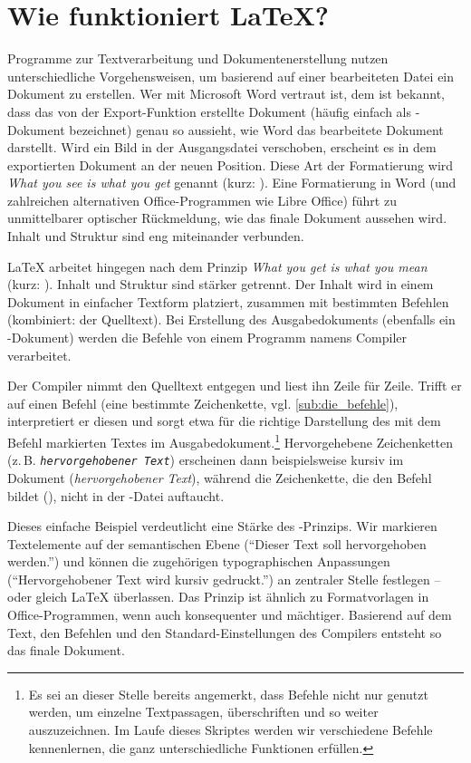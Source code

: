 \section{Wie funktioniert \LaTeX?}
\label{sec:wie_funktioniert_latex_}

Programme zur Textverarbeitung und Dokumentenerstellung nutzen unterschiedliche Vorgehensweisen, um basierend auf einer bearbeiteten Datei ein Dokument zu erstellen.
Wer mit Microsoft Word vertraut ist, dem ist bekannt, dass das von der Export-Funktion erstellte Dokument (häufig einfach als -Dokument bezeichnet) genau so aussieht, wie Word das bearbeitete Dokument darstellt.
Wird ein Bild in der Ausgangsdatei verschoben, erscheint es in dem exportierten Dokument an der neuen Position.
Diese Art der Formatierung wird \emph{What you see is what you get} genannt (kurz: ).
Eine Formatierung in Word (und zahlreichen alternativen Office-Programmen wie Libre Office) führt zu unmittelbarer optischer Rückmeldung, wie das finale Dokument aussehen wird. 
Inhalt und Struktur sind eng miteinander verbunden.

\LaTeX{} arbeitet hingegen nach dem Prinzip \emph{What you get is what you mean} (kurz: ).
Inhalt und Struktur sind stärker getrennt.
Der Inhalt wird in einem Dokument in einfacher Textform platziert, zusammen mit bestimmten Befehlen (kombiniert: der Quelltext).
Bei Erstellung des Ausgabedokuments (ebenfalls ein -Dokument) werden die Befehle von einem Programm namens Compiler verarbeitet.

Der Compiler nimmt den Quelltext entgegen und liest ihn Zeile für Zeile.
Trifft er auf einen Befehl (eine bestimmte Zeichenkette, vgl. \cref{sub:die_befehle}), interpretiert er diesen und sorgt etwa für die richtige Darstellung des mit dem Befehl markierten Textes im Ausgabedokument.\footnote{Es sei an dieser Stelle bereits angemerkt, dass Befehle nicht nur genutzt werden, um einzelne Textpassagen, überschriften und so weiter auszuzeichnen. Im Laufe dieses Skriptes werden wir verschiedene Befehle kennenlernen, die ganz unterschiedliche Funktionen erfüllen.}
Hervorgehebene Zeichenketten (z.\,B. \texttt{\emph{hervorgehobener Text}}) erscheinen dann beispielsweise kursiv im Dokument (\emph{hervorgehobener Text}), während die Zeichenkette, die den Befehl bildet (\texttt{\emph{}}), nicht in der -Datei auftaucht.

Dieses einfache Beispiel verdeutlicht eine Stärke des -Prinzips. 
Wir markieren Textelemente auf der semantischen Ebene (\enquote{Dieser Text soll hervorgehoben werden.}) und können die zugehörigen typographischen Anpassungen (\enquote{Hervorgehobener Text wird kursiv gedruckt.}) an zentraler Stelle festlegen -- oder gleich \LaTeX{} überlassen.
Das Prinzip ist ähnlich zu Formatvorlagen in Office-Programmen, wenn auch konsequenter und mächtiger.
Basierend auf dem Text, den Befehlen und den Standard-Einstellungen des Compilers entsteht so das finale Dokument.

